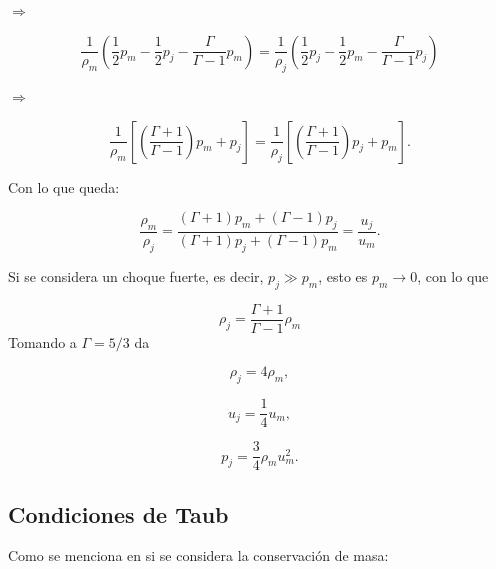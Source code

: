 \documentclass[12pt,a4paper]{book}
\begin{document}
$\Rightarrow$

\begin{equation*}
\frac{1}{\rho_{m}} \left( \frac{1}{2} p_{m}- \frac{1}{2} p_{j}-
\frac{\Gamma}{\Gamma-1} p_{m} \right)
=
\frac{1}{\rho_{j}} \left( \frac{1}{2} p_{j}- \frac{1}{2} p_{m}-
\frac{\Gamma}{\Gamma-1} p_{j} \right)
\end{equation*}

$\Rightarrow$

\begin{equation*}
\frac{1}{\rho_{m}} \left[  \left(\frac{\Gamma + 1}{\Gamma - 1} \right) p_{m} + p_{j} \right]
=
\frac{1}{\rho_{j}} \left[  \left(\frac{\Gamma + 1}{\Gamma - 1} \right) p_{j} + p_{m} \right].
\end{equation*}

\noindent Con lo que queda:

\begin{equation}\label{RH_no_rel_choque_no_fuerte}
\frac{\rho_{m}}{\rho_j} =
\frac{\left( \Gamma +1 \right) p_{m}+ \left( \Gamma -1 \right) p_{j
}}{\left(\Gamma +1 \right) p_{j}+ \left( \Gamma -1 \right) p_{m}}
= \frac{u_j}{u_m}.
\end{equation}

\noindent Si se considera un choque fuerte, es decir, $p_j \gg p_m$, esto es $p_m \rightarrow 0$, con lo que

\begin{equation}
\rho_j = \frac{\Gamma +1}{\Gamma-1} \rho_m 
\end{equation}
Tomando a $\Gamma = 5/3$ da

\begin{equation}
\rho_j = 4 \rho_m,
\end{equation}

\begin{equation}
u_j = \frac{1}{4} u_m,
\end{equation}

\begin{equation}
p_{j} = \frac{3}{4}\rho_m u_m^{2}.
\end{equation}




\subsection{Condiciones de Taub}



Como se menciona en \citet{Landau1987} si se considera la conservación de masa:
\end{document}
